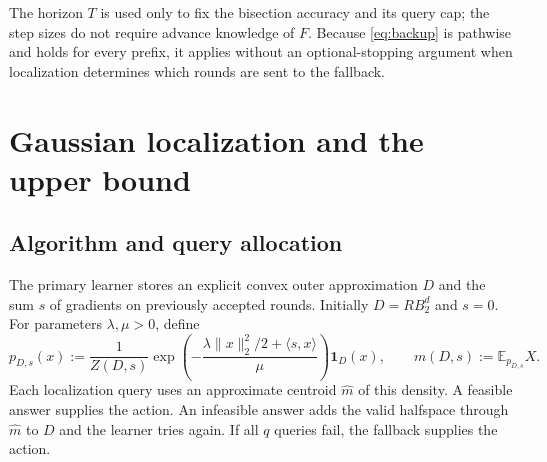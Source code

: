 \documentclass[11pt]{article}
\newcommand{\E}{\mathbb E}
\newcommand{\ip}[2]{\langle #1,#2\rangle}
\newcommand{\norm}[1]{\lVert #1\rVert}
\newcommand{\ind}{\mathbf 1}
\theoremstyle{definition}
\begin{document}
The horizon $T$ is used only to fix the bisection accuracy and its query cap;
the step sizes do not require advance knowledge of $F$. Because
\eqref{eq:backup} is pathwise and holds for every prefix, it applies without
an optional-stopping argument when localization determines which rounds
are sent to the fallback.

\section{Gaussian localization and the upper bound}\label{sec:upper}

\subsection{Algorithm and query allocation}

The primary learner stores an explicit convex outer approximation $D$ and
the sum $s$ of gradients on previously accepted rounds. Initially
$D=RB_2^d$ and $s=0$. For parameters $\lambda,\mu>0$, define
\begin{equation}\label{eq:gibbs}
 p_{D,s}(x):=\frac{1}{Z(D,s)}
 \exp\!\left(-\frac{\lambda\norm{x}_2^2/2+\ip{s}{x}}{\mu}\right)
 \ind_D(x),
 \qquad m(D,s):=\E_{p_{D,s}}X.
\end{equation}
Each localization query uses an approximate centroid $\widehat m$ of this
density. A feasible answer supplies the action. An infeasible answer adds
the valid halfspace through $\widehat m$ to $D$ and the learner tries again.
If all $q$ queries fail, the fallback supplies the action.
\end{document}
